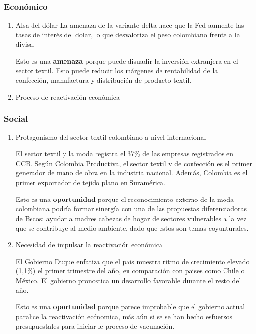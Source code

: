 \documentclass[11pt]{article}
\begin{document}
\subsubsection{Económico}
\label{sec:org500d3b4}
\begin{enumerate}
\item Alsa del dólar
\label{sec:orga063f33}
La amenaza de la variante delta hace que la Fed aumente las tasas de
interés del dolar, lo que desvaloriza el peso colombiano frente a la
divisa.

Esto es una \textbf{amenaza} porque puede disuadir la inversión extranjera
en el sector textil. Esto puede reducir los márgenes de
rentabilidad de la confección, manufactura y distribución
de producto textil.

\item Proceso de reactivación económica
\label{sec:org28a33b2}
\end{enumerate}
\subsubsection{Social}
\label{sec:orgd702a4a}
\begin{enumerate}
\item Protagonismo del sector textil colombiano a nivel internacional
\label{sec:org67929b6}

El sector textil y la moda registra el 37\% de las empresas registrados en CCB.
Según Colombia Productiva, el sector textil y de confección es el primer
generador de mano de obra en la industria nacional. Además, Colombia es el
primer exportador de tejido plano en Suramérica.

Esto es una \textbf{oportunidad} porque el reconocimiento externo de la moda colombiana
podría formar sinergía con una de las propuestas diferenciadoras de Becos:
ayudar a madres cabezas de hogar de sectores vulnerables a la vez que se
contribuye al medio ambiente, dado que estos son temas coyunturales.

\item Necesidad de impulsar la reactivación económica
\label{sec:orgac7ebb8}

El Gobierno Duque enfatiza que el pais muestra ritmo de crecimiento
elevado (1,1\%) el primer trimestre del año, en comparación con paises
como Chile o México. El gobierno pronostica un desarrollo favorable
durante el resto del año.

Esto es una \textbf{oportunidad} porque parece improbable que el gobierno
actual paralice la reactivación ecónomica, más aún si se se han hecho
esfuerzos presupuestales para iniciar le proceso de vacunación.
\end{enumerate}
\end{document}
